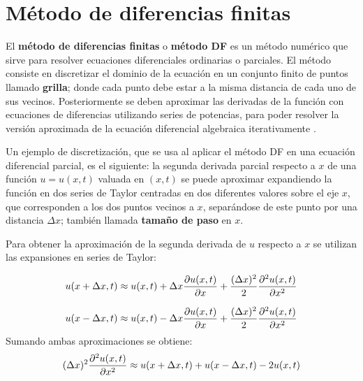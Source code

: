 \documentclass[12pt]{article}
\begin{document}
	\newpage
	\tableofcontents
	\clearpage
	
	\section{Método de diferencias finitas}
	El \textbf{método de diferencias finitas} o \textbf{método DF} es un método numérico que sirve para resolver ecuaciones diferenciales ordinarias o parciales. El método consiste en discretizar el dominio de la ecuación en un conjunto finito de puntos llamado \textbf{grilla}; donde cada punto debe estar a la misma distancia de cada uno de sus vecinos. Posteriormente se deben aproximar las derivadas de la función con ecuaciones de diferencias utilizando series de potencias, para poder resolver la versión aproximada de la ecuación diferencial algebraica iterativamente \cite{devries2011first}.
	
	Un ejemplo de discretización, que se usa al aplicar el método DF en una ecuación diferencial parcial, es el siguiente: la segunda derivada parcial respecto a $x$ de una función $u = u(x,t)$ valuada en $(x,t)$ se puede aproximar expandiendo la función en dos series de Taylor centradas en dos diferentes valores sobre el eje $x$, que corresponden a los dos puntos vecinos a $x$, separándose de este punto por una distancia $\Delta x$; también llamada \textbf{tamaño de paso} en $x$. 
	
	Para obtener la aproximación de la segunda derivada de $u$ respecto a $x$ se utilizan las expansiones en series de Taylor:

	\begin{equation}
		u(x + \Delta x,t) \approx u(x,t) + \Delta x\pdv{u(x,t)}{x} + \frac{(\Delta x)^{2}}{2}\pdv{^{2}u(x,t)}{x^2} 
	\end{equation}

	\begin{equation}
		u(x - \Delta x,t) \approx u(x,t) - \Delta x\pdv{u(x,t)}{x}+\frac{(\Delta x)^{2}}{2}\pdv{^{2}u(x,t)}{x^2} 
	\end{equation}
	Sumando ambas aproximaciones se obtiene:
	\begin{equation}
		(\Delta x)^2 \pdv{^{2}u(x,t)}{x^2}\approx u(x + \Delta x,t) + u(x - \Delta x,t) - 2 u(x,t)
	\end{equation}
\end{document}
